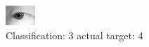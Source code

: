 \begin{figure}[h!]
\begin{center}
\includegraphics[width=0.60\columnwidth]{figures/ID1240_class_3_target_4.png}
\end{center}
\caption{ Classification: 3 actual target: 4}
\label{fig:ID1240_class_3_target_4}
\end{figure}
